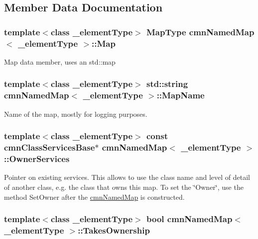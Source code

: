 \subsection{Member Data Documentation}
\hypertarget{classcmn_named_map_aa5cb7ee747ba8ccc07557a5da5d48b19}{
\subsubsection[{Map}]{\setlength{\rightskip}{0pt plus 5cm}template$<$class \-\_\-element\-Type$>$ {\bf Map\-Type} {\bf cmn\-Named\-Map}$<$ \-\_\-element\-Type $>$\-::Map\hspace{0.3cm}{\ttfamily [protected]}}}\label{classcmn_named_map_aa5cb7ee747ba8ccc07557a5da5d48b19}
Map data member, uses an std\-::map \hypertarget{classcmn_named_map_a5dd1ca924e7481edf3e9c6f65c0f4b3d}{
\subsubsection[{Map\-Name}]{\setlength{\rightskip}{0pt plus 5cm}template$<$class \-\_\-element\-Type$>$ std\-::string {\bf cmn\-Named\-Map}$<$ \-\_\-element\-Type $>$\-::Map\-Name\hspace{0.3cm}{\ttfamily [protected]}}}\label{classcmn_named_map_a5dd1ca924e7481edf3e9c6f65c0f4b3d}
Name of the map, mostly for logging purposes. \hypertarget{classcmn_named_map_a8e6bffe8f1bdc710bacc3f1d38d75621}{
\subsubsection[{Owner\-Services}]{\setlength{\rightskip}{0pt plus 5cm}template$<$class \-\_\-element\-Type$>$ const {\bf cmn\-Class\-Services\-Base}$\ast$ {\bf cmn\-Named\-Map}$<$ \-\_\-element\-Type $>$\-::Owner\-Services\hspace{0.3cm}{\ttfamily [protected]}}}\label{classcmn_named_map_a8e6bffe8f1bdc710bacc3f1d38d75621}
Pointer on existing services. This allows to use the class name and level of detail of another class, e.\-g. the class that owns this map. To set the \char`\"{}\-Owner\char`\"{}, use the method Set\-Owner after the \hyperlink{classcmn_named_map}{cmn\-Named\-Map} is constructed. \hypertarget{classcmn_named_map_ad3775ffc68ea99a853f8eed94f1f1a4f}{
\subsubsection[{Takes\-Ownership}]{\setlength{\rightskip}{0pt plus 5cm}template$<$class \-\_\-element\-Type$>$ bool {\bf cmn\-Named\-Map}$<$ \-\_\-element\-Type $>$\-::Takes\-Ownership\hspace{0.3cm}{\ttfamily [protected]}}}\label{classcmn_named_map_ad3775ffc68ea99a853f8eed94f1f1a4f}
